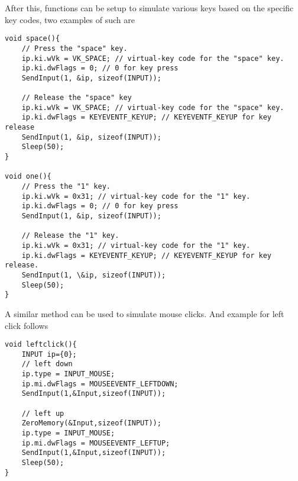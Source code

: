 After this, functions can be setup to simulate various keys based on the specific key codes, two examples of such are
\begin{lstlisting}
void space(){ 
	// Press the "space" key.  
	ip.ki.wVk = VK_SPACE; // virtual-key code for the "space" key.                                                                                
	ip.ki.dwFlags = 0; // 0 for key press                                                                                                        
	SendInput(1, &ip, sizeof(INPUT));
	
	// Release the "space" key                                                                                                                   
	ip.ki.wVk = VK_SPACE; // virtual-key code for the "space" key.                                                                                
	ip.ki.dwFlags = KEYEVENTF_KEYUP; // KEYEVENTF_KEYUP for key release                                                                          
	SendInput(1, &ip, sizeof(INPUT));
	Sleep(50);
}

void one(){ 
	// Press the "1" key.    
	ip.ki.wVk = 0x31; // virtual-key code for the "1" key.                                          
	ip.ki.dwFlags = 0; // 0 for key press                                                                                                        
	SendInput(1, &ip, sizeof(INPUT));
	
	// Release the "1" key.                                                                                                                    
	ip.ki.wVk = 0x31; // virtual-key code for the "1" key.                                                                                      
	ip.ki.dwFlags = KEYEVENTF_KEYUP; // KEYEVENTF_KEYUP for key release.                                                                          
	SendInput(1, \&ip, sizeof(INPUT));
	Sleep(50);
}
\end{lstlisting}

A similar method can be used to simulate mouse clicks. And example for left click follows
\begin{lstlisting}
void leftclick(){
	INPUT ip={0};
	// left down                                                                                                                                   
	ip.type = INPUT_MOUSE;
	ip.mi.dwFlags = MOUSEEVENTF_LEFTDOWN;
	SendInput(1,&Input,sizeof(INPUT));
	
	// left up                                                                                                                                     
	ZeroMemory(&Input,sizeof(INPUT));
	ip.type = INPUT_MOUSE;
	ip.mi.dwFlags = MOUSEEVENTF_LEFTUP;
	SendInput(1,&Input,sizeof(INPUT));
	Sleep(50);
}
\end{lstlisting}



